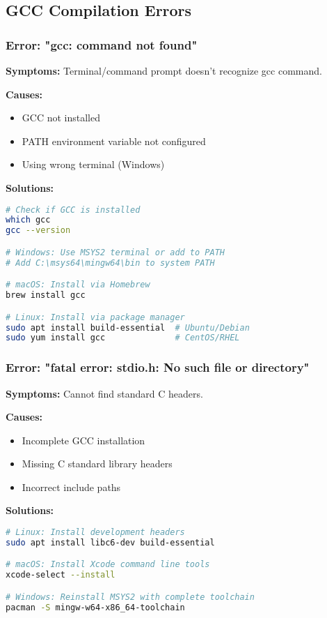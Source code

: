 \documentclass[11pt,a4paper]{article}
\begin{document}
\subsection{GCC Compilation Errors}

\subsubsection{Error: "gcc: command not found"}
\textbf{Symptoms:} Terminal/command prompt doesn't recognize gcc command.

\textbf{Causes:}
\begin{itemize}
    \item GCC not installed
    \item PATH environment variable not configured
    \item Using wrong terminal (Windows)
\end{itemize}

\textbf{Solutions:}
\begin{lstlisting}[language=bash]
# Check if GCC is installed
which gcc
gcc --version

# Windows: Use MSYS2 terminal or add to PATH
# Add C:\msys64\mingw64\bin to system PATH

# macOS: Install via Homebrew
brew install gcc

# Linux: Install via package manager
sudo apt install build-essential  # Ubuntu/Debian
sudo yum install gcc              # CentOS/RHEL
\end{lstlisting}

\subsubsection{Error: "fatal error: stdio.h: No such file or directory"}
\textbf{Symptoms:} Cannot find standard C headers.

\textbf{Causes:}
\begin{itemize}
    \item Incomplete GCC installation
    \item Missing C standard library headers
    \item Incorrect include paths
\end{itemize}

\textbf{Solutions:}
\begin{lstlisting}[language=bash]
# Linux: Install development headers
sudo apt install libc6-dev build-essential

# macOS: Install Xcode command line tools
xcode-select --install

# Windows: Reinstall MSYS2 with complete toolchain
pacman -S mingw-w64-x86_64-toolchain
\end{lstlisting}
\end{document}
